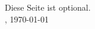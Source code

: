 
\chapter*{} \label{Danksagung}

Diese Seite ist optional.\\[2cm]

\Ort , \printdayoff \today \printdayon
